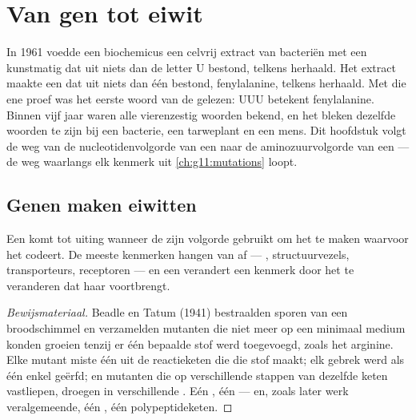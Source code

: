 \chapter{Van gen tot eiwit}\label{ch:g11:gene-expression}

In 1961 voedde een biochemicus een celvrij extract van bacteriën met een
kunstmatig  dat uit niets dan de letter U bestond, telkens herhaald.
Het extract maakte een  dat uit niets dan één  bestond,
fenylalanine, telkens herhaald. Met die ene proef was het eerste woord
van de  gelezen: UUU betekent fenylalanine. Binnen vijf
jaar waren alle vierenzestig woorden bekend, en het bleken dezelfde
woorden te zijn bij een bacterie, een tarweplant en een mens. Dit
hoofdstuk volgt de weg van de nucleotidenvolgorde van een  naar de
aminozuurvolgorde van een  --- de weg waarlangs elk kenmerk uit
\cref{ch:g11:mutations} loopt.

\section{Genen maken eiwitten}

\begin{proposition}\label{prop:g11:gene-expression:onegene}
Een  komt tot uiting wanneer de  zijn volgorde gebruikt om het
 te maken waarvoor het codeert. De meeste kenmerken hangen van
 af --- , structuurvezels, transporteurs, receptoren ---
en een  verandert een kenmerk door het  te veranderen dat
haar  voortbrengt.
\end{proposition}
\begin{proof}[Bewijsmateriaal]
Beadle en Tatum (1941) bestraalden sporen van een broodschimmel en
verzamelden mutanten die niet meer op een minimaal medium konden groeien
tenzij er één bepaalde stof werd toegevoegd, zoals het 
arginine. Elke mutant miste één  uit de reactieketen die die stof
maakt; elk gebrek werd als één enkel  geërfd; en mutanten die op
verschillende stappen van dezelfde keten vastliepen, droegen  in
verschillende . Eén , één  --- en, zoals later werk
veralgemeende, één , één polypeptideketen.
\end{proof}

